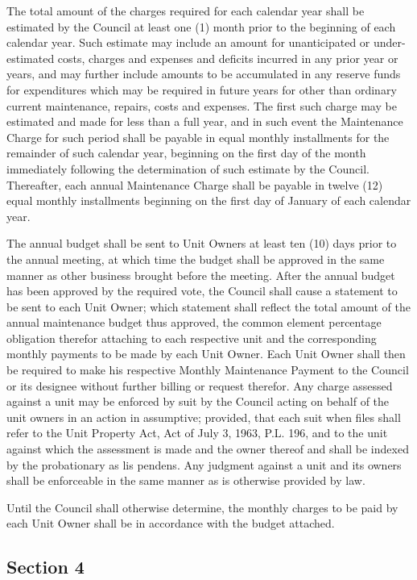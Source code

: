 \documentclass[
  14pt,
]{book}
\begin{document}
The total amount of the charges required for each calendar year shall be estimated by the Council at least one (1) month prior to the beginning of each calendar year. Such estimate may include an amount for unanticipated or under-estimated costs, charges and expenses and deficits incurred in any prior year or years, and may further include amounts to be accumulated in any reserve funds for expenditures which may be required in future years for other than ordinary current maintenance, repairs, costs and expenses. The first such charge may be estimated and made for less than a full year, and in such event the Maintenance Charge for such period shall be payable in equal monthly installments for the remainder of such calendar year, beginning on the first day of the month immediately following the determination of such estimate by the Council. Thereafter, each annual Maintenance Charge shall be payable in twelve (12) equal monthly installments beginning on the first day of January of each calendar year.

The annual budget shall be sent to Unit Owners at least ten (10) days prior to the annual meeting, at which time the budget shall be approved in the same manner as other business brought before the meeting. After the annual budget has been approved by the required vote, the Council shall cause a statement to be sent to each Unit Owner; which statement shall reflect the total amount of the annual maintenance budget thus approved, the common element percentage obligation therefor attaching to each respective unit and the corresponding monthly payments to be made by each Unit Owner. Each Unit Owner shall then be required to make his respective Monthly Maintenance Payment to the Council or its designee without further billing or request therefor. Any charge assessed against a unit may be enforced by suit by the Council acting on behalf of the unit owners in an action in assumptive; provided, that each suit when files shall refer to the Unit Property Act, Act of July 3, 1963, P.L. 196, and to the unit against which the assessment is made and the owner thereof and shall be indexed by the probationary as lis pendens. Any judgment against a unit and its owners shall be enforceable in the same manner as is otherwise provided by law.

Until the Council shall otherwise determine, the monthly charges to be paid by each Unit Owner shall be in accordance with the budget attached.

\hypertarget{section-4-3}{%
\subsection*{Section 4}\label{section-4-3}}
\end{document}
